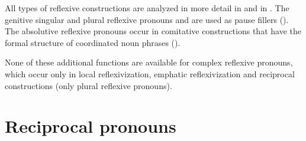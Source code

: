All types of reflexive constructions are analyzed in more detail in  and in \citet{Forker2014}. The genitive singular and plural reflexive pronouns  and  are used as pause fillers (). The absolutive reflexive pronouns occur in comitative constructions that have the formal structure of coordinated noun phrases ().

None of these additional functions are available for complex reflexive pronouns, which occur only in local reflexivization, emphatic reflexivization and reciprocal constructions (only plural reflexive pronouns).



\section{Reciprocal pronouns}
\label{sec:Reciprocal pronouns}

